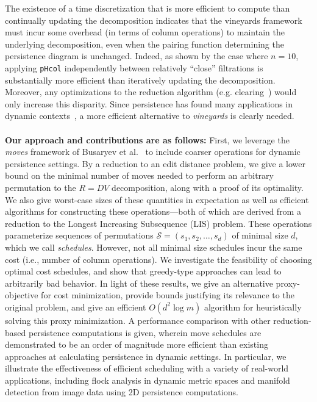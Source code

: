 \documentclass[sn-mathphys]{sn-jnl}
\begin{document}
The existence of a time discretization that is more efficient to compute than continually updating the decomposition indicates that the vineyards framework must incur some overhead (in terms of column operations) to maintain the underlying decomposition, even when the pairing function determining the persistence diagram is unchanged. 
Indeed, as shown by the case where $n = 10$, applying \texttt{pHcol} independently between  relatively ``close'' filtrations is substantially more efficient than iteratively updating the decomposition.
 Moreover, any optimizations to the reduction algorithm (e.g. clearing~\cite{chen2011persistent}) would only increase this disparity.
Since persistence has found many applications in dynamic contexts~\cite{topaz2015topological, xian2020capturing, lesnick2015interactive, kim2020spatiotemporal}, a more efficient alternative to \emph{vineyards} is clearly needed. 
 \\
 \\
 \noindent
\textbf{Our approach and contributions are as follows:} First, we leverage the \emph{moves} framework of Busaryev et al.~\cite{busaryev2010tracking} to include  coarser  operations for dynamic persistence settings. 
By a reduction to an edit distance problem, we give a   lower bound on the minimal number of moves needed to perform an arbitrary permutation to the $R = D V$ decomposition,  along with a proof of its optimality.
We also give worst-case sizes of these quantities in expectation as well as efficient algorithms for constructing these operations---both of which are derived from a reduction to the Longest Increasing Subsequence (LIS) problem. 
These operations parameterize sequences of permutations $\mathcal{S}= ( s_1, s_2, \dots, s_d )$ of minimal size $d$, which we call \emph{schedules}. 
However, not all minimal size schedules incur the same  cost 
(i.e., number of column operations).
We investigate the feasibility of choosing optimal cost schedules, and show that 
greedy-type approaches can lead to arbitrarily bad behavior. 
In light of these results, we give an alternative proxy-objective for cost minimization, provide bounds justifying its relevance to the original problem, and give an efficient $O(d^2 \log m)$ algorithm for heuristically solving this proxy minimization. 
A performance comparison with other reduction-based persistence computations is given, wherein move schedules are demonstrated to be an order of magnitude more efficient than existing approaches at calculating persistence in dynamic settings. In particular, we illustrate the effectiveness of efficient scheduling with a variety of real-world applications, including flock analysis in dynamic metric spaces and manifold detection from image data using 2D persistence computations. 
  
\end{document}
